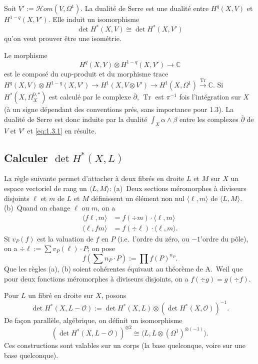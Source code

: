 \documentclass[12pt,a4paper]{article}
\theoremstyle{plain}
\theoremstyle{definition}
\DeclareMathOperator{\Tr}{Tr}
\newcommand{\CC}{\mathbb{C}}
\newcommand{\Oo}{\mathscr{O}}
\begin{document}
Soit $V' := \mathscr{H}om(V, \Omega^1)$. La dualit\'e de Serre est une dualit\'e entre $H^q(X,V)$
et $H^{1-q}(X,V')$. Elle induit un isomorphisme
\begin{equation}\label{eq:1.3.1}
\det H^*(X,V) \cong \det H^*(X,V')
\end{equation}
qu'on veut prouver \^etre une isom\'etrie.

Le morphisme
\[
H^q(X,V) \otimes H^{1-q}(X,V') \longrightarrow \CC
\]
est le compos\'e du cup-produit et du morphisme trace $H^q(X,V) \otimes H^{1-q}(X,V') \to
H^1(X, V \otimes V') \to H^1(X, \Omega^1) \xrightarrow{\Tr} \CC$. Si $H^*(X, \Omega^{0,*}_X)$ est calcul\'e par le complexe
$\bar\partial$, $\Tr$ est $\pi^{-1}$ fois l'int\'egration sur $X$ (\`a un signe d\'ependant des conventions
pr\'es, sans importance pour 1.3). La dualit\'e de Serre est donc induite par la
dualit\'e $\int_X \alpha \wedge \beta$ entre les complexes $\bar\partial$ de $V$ et $V'$ et \eqref{eq:1.3.1} en r\'esulte.

\subsection{Calculer $\det H^*(X,L)$}

La r\`egle suivante permet d'attacher \`a deux fibr\'es en droite $L$ et $M$ sur
$X$ un espace vectoriel de rang un $\langle L, M \rangle$: (a)~Deux sections m\'eromorphes \`a
diviseurs disjoints $\ell$ et $m$ de $L$ et $M$ d\'efinissent un \'el\'ement non nul
$\langle \ell, m \rangle$ de $\langle L, M \rangle$. (b)~Quand on change $\ell$ ou $m$, on a
\begin{equation}\label{eq:1.4.1}
\begin{aligned}
\langle f\ell, m \rangle &= f(\div m) \cdot \langle \ell, m \rangle \\
\langle \ell, fm \rangle &= f(\div \ell) \cdot \langle \ell, m \rangle .
\end{aligned}
\end{equation}
Si $v_P(f)$ est la valuation de $f$ en $P$ (i.e.\ l'ordre du z\'ero, ou $-1$'ordre du
p\^ole), on a $\div \ell := \sum v_P(\ell) \cdot P$; on pose
\[
f(\sum n_P \cdot P) := \prod f(P)^{n_P} .
\]
Que les r\`egles (a), (b) soient coh\'erentes \'equivaut au th\'eor\`eme de A.~Weil que pour
deux fonctions m\'eromorphes \`a diviseurs disjoints, on a $f(\div g) = g(\div f)$.

Pour $L$ un fibr\'e en droite sur $X$, posons
\[
\det H^*(X, L - \Oo) := \det H^*(X,L) \otimes (\det H^*(X,\Oo))^{-1} .
\]
De fa\c{c}on parall\`ele, alg\'ebrique, on d\'efinit un isomorphisme
\begin{equation}\label{eq:1.4.2}
(\det H^*(X, L - \Oo))^{\otimes 2} \cong \langle L, L \otimes (\Omega^1)^{\otimes(-1)} \rangle .
\end{equation}
Ces constructions sont valables sur un corps (la base quelconque, voire sur
une base quelconque).
\end{document}
